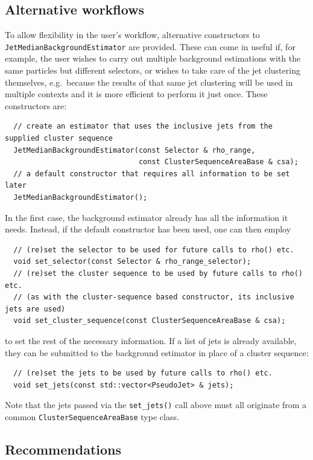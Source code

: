 \documentclass[12pt,a4]{article}
\newcommand{\ttt}[1]{{\small\texttt{#1}}}
\begin{document}
\subsection{Alternative workflows}
%
To allow flexibility in the user's workflow, 
alternative constructors to \ttt{JetMedianBackgroundEstimator} are provided.
%
These can come in useful if, for example, the user wishes to carry out
multiple background estimations with the same particles but different
selectors, or wishes to take care of the jet clustering themselves,
e.g.\ because the results of that same jet clustering will be used in
multiple contexts and it is more efficient to perform it just once. These
constructors are:
\begin{lstlisting}
  // create an estimator that uses the inclusive jets from the supplied cluster sequence
  JetMedianBackgroundEstimator(const Selector & rho_range, 
                               const ClusterSequenceAreaBase & csa);
  // a default constructor that requires all information to be set later
  JetMedianBackgroundEstimator();
\end{lstlisting}
In the first case, the background estimator already has all the information it
needs. Instead, if the default constructor has been used, one can then employ
\begin{lstlisting}
  // (re)set the selector to be used for future calls to rho() etc.
  void set_selector(const Selector & rho_range_selector);
  // (re)set the cluster sequence to be used by future calls to rho() etc. 
  // (as with the cluster-sequence based constructor, its inclusive jets are used)
  void set_cluster_sequence(const ClusterSequenceAreaBase & csa);
\end{lstlisting}
to set the rest of the necessary information. If a list of jets is already
available, they can be submitted to the background estimator in place
of a cluster sequence:
\begin{lstlisting}
  // (re)set the jets to be used by future calls to rho() etc. 
  void set_jets(const std::vector<PseudoJet> & jets);
\end{lstlisting}
Note that the jets passed via the \ttt{set\_jets()} call above must
all originate from a common \ttt{ClusterSequenceAreaBase} type class.

 
\subsection{Recommendations}
\end{document}
